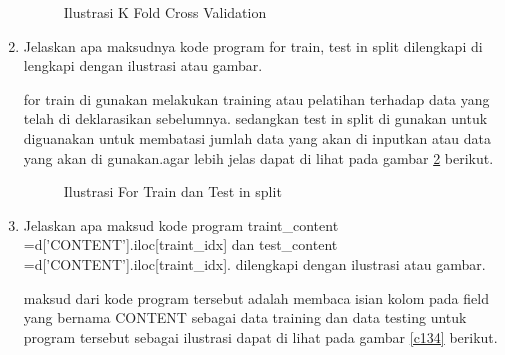 \begin{enumerate}
\begin{figure}[!htbp]
      \caption{Ilustrasi K Fold Cross Validation}
      \label{c132}
      \end{figure}

\item Jelaskan apa maksudnya kode program for train, test in split dilengkapi di lengkapi dengan ilustrasi atau gambar.\par
for train di gunakan melakukan training atau pelatihan terhadap data yang telah di deklarasikan sebelumnya. sedangkan test in split di gunakan untuk diguanakan untuk membatasi jumlah data yang akan di inputkan atau data yang akan di gunakan.agar lebih jelas dapat di lihat pada gambar \ref{c133} berikut.

\begin{figure}[!htbp]
      \caption{Ilustrasi For Train dan Test in split}
      \label{c133}
      \end{figure}

\item Jelaskan apa maksud kode program traint\_content =d['CONTENT'].iloc[traint\_idx] dan test\_content =d['CONTENT'].iloc[traint\_idx]. dilengkapi dengan ilustrasi atau gambar.\par
maksud dari kode program tersebut adalah membaca isian kolom pada field yang bernama CONTENT sebagai data training dan data testing untuk program tersebut sebagai ilustrasi dapat di lihat pada gambar \ref{c134} berikut.


\end{enumerate}
